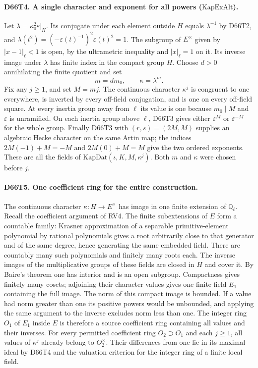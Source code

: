 \paragraph{D66T4. A single character and exponent for all powers ($\mathrm{KapExAlt}$).}
Let $\lambda=\kappa_0^2\varepsilon|_H$. Its conjugate under each
element outside $H$ equals $\lambda^{-1}$ by D66T2, and
$\lambda(t^2)=(-\varepsilon(t)^{-1})^2\varepsilon(t)^2=1$.
The subgroup of $E^\times$ given by $|x-1|_\ell<1$ is open, by
the ultrametric inequality and $|x|_\ell=1$ on it. Its inverse
image under $\lambda$ has finite index in the compact group $H$.
Choose $d>0$ annihilating the finite quotient and set
\[
                      m=d m_0,\qquad \kappa=\lambda^m .
\]
Fix any $j\ge1$, and set $M=mj$. The continuous character
$\kappa^j$ is congruent to one everywhere, is inverted by every
off-field conjugation, and is one on every off-field square.
At every inertia group away from $\ell$ its value is one because
$m_0\mid M$ and $\varepsilon$ is unramified. On each inertia group
above $\ell$, D66T3 gives either $\varepsilon^{M}$ or
$\varepsilon^{-M}$ for the whole group. Finally D66T3 with
$(r,s)=(2M,M)$ supplies an algebraic Hecke character on the
same Artin map; the indices $2M(-1)+M=-M$ and $2M(0)+M=M$
give the two ordered exponents. These are all the fields of
$\mathrm{KapDat}(\iota,K,M,\kappa^j)$. Both $m$ and $\kappa$
were chosen before $j$.

\paragraph{D66T5. One coefficient ring for the entire construction.}
The continuous character $\kappa:H\to E^\times$ has image in
one finite extension of $\mathbb Q_\ell$. Recall the coefficient
argument of RV4. The finite subextensions of $E$ form a countable
family: Krasner approximation of a separable primitive-element
polynomial by rational polynomials gives a root arbitrarily close
to that generator and of the same degree, hence generating the
same embedded field. There are countably many such polynomials and
finitely many roots each. The inverse images of the multiplicative
groups of these fields are closed in $H$ and cover it. By Baire's
theorem one has interior and is an open subgroup. Compactness
gives finitely many cosets; adjoining their character values gives
one finite field $E_1$ containing the full image. The norm of this
compact image is bounded. If a value had norm greater than one
its positive powers would be unbounded, and applying the same
argument to the inverse excludes norm less than one. The integer
ring $O_1$ of $E_1$ inside $E$ is therefore a source coefficient
ring containing all values and their inverses. For every permitted
coefficient ring $O_2\supset O_1$ and each $j\ge1$, all values
of $\kappa^j$ already belong to $O_2^\times$. Their differences
from one lie in its maximal ideal by D66T4 and the valuation
criterion for the integer ring of a finite local field.

